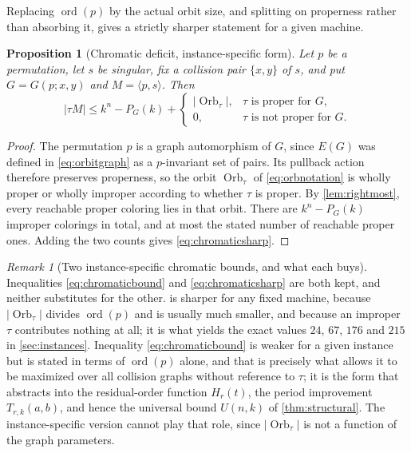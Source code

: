 \documentclass[11pt,a4paper]{article}
\numberwithin{equation}{section}
\newtheorem{proposition}[theorem]{Proposition}
\theoremstyle{definition}
\theoremstyle{remark}
\newtheorem{remark}[theorem]{Remark}
\newcommand{\ord}{\operatorname{ord}}
\newcommand{\Orb}{\operatorname{Orb}}
\begin{document}
Replacing $\ord(p)$ by the actual orbit size, and splitting on properness
rather than absorbing it, gives a strictly sharper statement for a given
machine.

\begin{proposition}[Chromatic deficit, instance-specific
form]\label{prop:chromatic}
Let $p$ be a permutation, let $s$ be singular, fix a collision pair
$\{x,y\}$ of $s$, and put $G=G(p;x,y)$ and $M=\langle p,s\rangle$. Then
\begin{equation}\label{eq:chromaticsharp}
 |\tau M|\le k^n-P_G(k)+
 \begin{cases}
  |\Orb_\tau|,&\tau\text{ is proper for }G,\\
  0,&\tau\text{ is not proper for }G.
 \end{cases}
\end{equation}
\end{proposition}
\begin{proof}
The permutation $p$ is a graph automorphism of $G$, since $E(G)$ was defined
in \eqref{eq:orbitgraph} as a $p$-invariant set of pairs. Its pullback
action therefore preserves properness, so the orbit $\Orb_\tau$ of
\eqref{eq:orbnotation} is wholly proper or wholly improper according to
whether $\tau$ is proper. By \cref{lem:rightmost}, every reachable proper
coloring lies in that orbit. There are $k^n-P_G(k)$ improper colorings in
total, and at most the stated number of reachable proper ones. Adding the two
counts gives \eqref{eq:chromaticsharp}.
\end{proof}

\begin{remark}[Two instance-specific chromatic bounds, and what each
buys]\label{rem:twochromatic}
Inequalities \eqref{eq:chromaticbound} and \eqref{eq:chromaticsharp} are both
kept, and neither substitutes for the other.
 is sharper for any fixed machine, because
$|\Orb_\tau|$ divides $\ord(p)$ and is usually much smaller, and because an
improper $\tau$ contributes nothing at all; it is what yields the exact
values $24$, $67$, $176$ and $215$ in \cref{sec:instances}.
Inequality \eqref{eq:chromaticbound} is weaker for a given instance but is
stated in terms of $\ord(p)$ alone, and that is precisely what allows it to
be maximized over all collision graphs without reference to $\tau$; it is the
form that abstracts into the residual-order function $H_r(t)$, the period
improvement $T_{r,k}(a,b)$, and hence the universal bound $U(n,k)$ of
\cref{thm:structural}. The instance-specific version cannot play that role,
since $|\Orb_\tau|$ is not a function of the graph parameters.
\end{remark}
\end{document}

